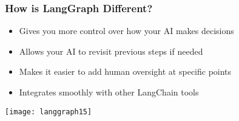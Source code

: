 \begin{frame}[fragile]\frametitle{How is LangGraph Different?}


      \begin{itemize}
        \item Gives you more control over how your AI makes decisions
        \item Allows your AI to revisit previous steps if needed
        \item Makes it easier to add human oversight at specific points
        \item Integrates smoothly with other LangChain tools
      \end{itemize}


\begin{center}
\texttt{[image: langgraph15]}
\end{center}

\end{frame}

